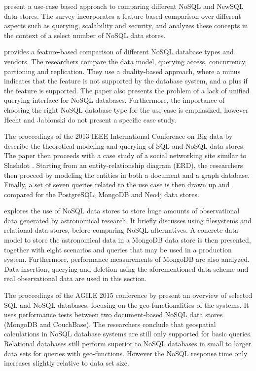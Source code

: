\textcite{Grolinger2013} present a use-case based approach to comparing different NoSQL and NewSQL data stores. The survey incorporates a feature-based comparison over different aspects such as querying, scalability and security, and analyzes these concepts in the context of a select number of NoSQL data stores.

\textcite{Hecht2011} provides a feature-based comparison of different NoSQL database types and vendors. The researchers compare the data model, querying access, concurrency, partioning and replication. They use a duality-based approach, where a minus indicates that the feature is not supported by the database system, and a plus if the feature is supported. The paper also presents the problem of a lack of unified querying interface for NoSQL databases. Furthermore, the importance of choosing the right NoSQL database type for the use case is emphasized, however Hecht and Jablonski do not present a specific case study.

The proceedings of the 2013 IEEE International Conference on Big data by \textcite{Kaur2013} describe the theoretical modeling and querying of SQL and NoSQL data stores. The paper then proceeds with a case study of a social networking site similar to Slashdot \autocite{Malda1997}. Starting from an entity-relationship diagram (ERD), the researchers then proceed by modeling the entities in both a document and a graph database. Finally, a set of seven queries related to the use case is then drawn up and compared for the PostgreSQL, MongoDB and Neo4j data stores.

\textcite{Zhao2015} explores the use of NoSQL data stores to store huge amounts of observational data generated by astronomical research. It briefly discusses using filesystems and relational data stores, before comparing NoSQL alternatives. A concrete data model to store the astronomical data in a MongoDB data store is then presented, together with eight scenarios and queries that may be used in a production system.
Furthermore, performance measurements of MongoDB are also analyzed. Data insertion, querying and deletion using the aforementioned data scheme and real observational data are used in this section.

The proceedings of the AGILE 2015 conference by \textcite{Schmid2015} present an overview of selected SQL and NoSQL databases, focusing on the geo-functionalities of the systems. It uses performance tests between two document-based NoSQL data stores (MongoDB and CouchBase). The researchers conclude that geospatial calculations in NoSQL database systems are still only supported for basic queries. Relational databases still perform superior to NoSQL databases in small to larger data sets for queries with geo-functions. However the NoSQL response time only increases slightly relative to data set size.

